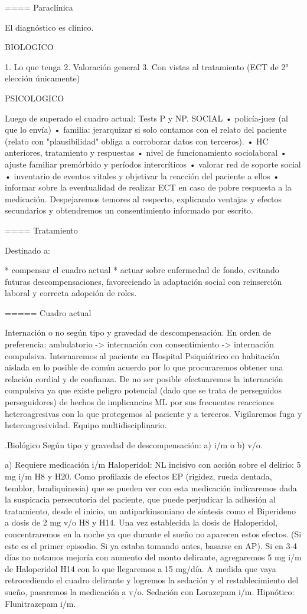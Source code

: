 ==== Paraclínica

El diagnóstico es clínico.

BIOLOGICO

1. Lo que tenga
2. Valoración general
3. Con vistas al tratamiento (ECT de 2° elección únicamente)

PSICOLOGICO

Luego de superado el cuadro actual: Tests P y NP. SOCIAL • policía-juez (al que lo envía) • familia: jerarquizar si solo contamos con el relato del paciente (relato con "plausibilidad" obliga a corroborar datos con terceros). • HC anteriores, tratamiento y respuestas • nivel de funcionamiento sociolaboral • ajuste familiar premórbido y períodos intercríticos • valorar red de soporte social • inventario de eventos vitales y objetivar la reacción del paciente a ellos • informar sobre la eventualidad de realizar ECT en caso de pobre respuesta a la medicación. Despejaremos temores al respecto, explicando ventajas y efectos secundarios y obtendremos un consentimiento informado por escrito.

==== Tratamiento

Destinado a:

* compensar el cuadro actual
* actuar sobre enfermedad de fondo, evitando futuras descompensaciones, favoreciendo la adaptación social con reinserción laboral y correcta adopción de roles.

===== Cuadro actual

Internación o no según tipo y gravedad de descompensación. En orden de preferencia: ambulatorio -> internación con consentimiento -> internación compulsiva. Internaremos al paciente en Hospital Psiquiátrico en habitación aislada en lo posible de común acuerdo por lo que procuraremos obtener una relación cordial y de confianza. De no ser posible efectuaremos la internación compulsiva ya que existe peligro potencial (dado que se trata de perseguidos perseguidores) de hechos de implicancias ML por sus frecuentes reacciones heteroagresivas con lo que protegemos al paciente y a terceros. Vigilaremos fuga y heteroagresividad. Equipo multidisciplinario.

.Biológico
Según tipo y gravedad de descompensación: a) i/m o b) v/o.

a) Requiere medicación i/m Haloperidol: NL incisivo con acción sobre el delirio: 5 mg i/m H8 y H20. Como profilaxis de efectos EP (rigidez, rueda dentada, temblor, bradiquinesia) que se pueden ver con esta medicación indicaremos dada la suspicacia persecutoria del paciente, que puede perjudicar la adhesión al tratamiento, desde el inicio, un antiparkinsoniano de síntesis como el Biperideno a dosis de 2 mg v/o H8 y H14. Una vez establecida la dosis de Haloperidol, concentraremos en la noche ya que durante el sueño no aparecen estos efectos. (Si este es el primer episodio. Si ya estaba tomando antes, basarse en AP). Si en 3-4 días no notamos mejoría con aumento del monto delirante, agregaremos 5 mg i/m de Haloperidol H14 con lo que llegaremos a 15 mg/día. A medida que vaya retrocediendo el cuadro delirante y logremos la sedación y el restablecimiento del sueño, pasaremos la medicación a v/o. Sedación con Lorazepam i/m. Hipnótico: Flunitrazepam i/m.

